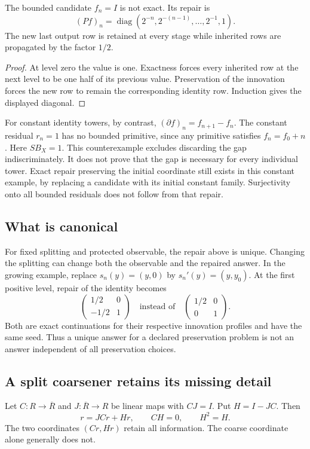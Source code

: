 \begin{example}\label{KS22}
The bounded candidate \(f_n=I\) is not exact. Its repair is
\[
 (Pf)_n=\operatorname{diag}(2^{-n},2^{-(n-1)},\ldots,2^{-1},1).
\]
The new last output row is retained at every stage while inherited rows are propagated by the factor \(1/2\).
\end{example}
\begin{proof}
At level zero the value is one. Exactness forces every inherited row at the next level to be one half of its previous value. Preservation of the innovation forces the new row to remain the corresponding identity row. Induction gives the displayed diagonal.
\end{proof}
For constant identity towers, by contrast, \((\partial f)_n=f_{n+1}-f_n\). The constant residual \(r_n=1\) has no bounded primitive, since any primitive satisfies \(f_n=f_0+n\). Here \(SB_X=1\). This counterexample excludes discarding the gap indiscriminately. It does not prove that the gap is necessary for every individual tower. Exact repair preserving the initial coordinate still exists in this constant example, by replacing a candidate with its initial constant family. Surjectivity onto all bounded residuals does not follow from that repair.

\subsection{What is canonical}
For fixed splitting and protected observable, the repair above is unique. Changing the splitting can change both the observable and the repaired answer. In the growing example, replace \(s_n(y)=(y,0)\) by \(s_n'(y)=(y,y_0)\). At the first positive level, repair of the identity becomes
\[
 \begin{pmatrix}1/2&0\\-1/2&1\end{pmatrix}
 \quad\text{instead of}\quad
 \begin{pmatrix}1/2&0\\0&1\end{pmatrix}.
\]
Both are exact continuations for their respective innovation profiles and have the same seed. Thus a unique answer for a declared preservation problem is not an answer independent of all preservation choices.

\label{sec:cascade}
\subsection{A split coarsener retains its missing detail}
Let \(C:R\to\overline R\) and \(J:\overline R\to R\) be linear maps with \(CJ=I\). Put \(H=I-JC\). Then
\[
 r=JCr+Hr,\qquad CH=0,\qquad H^2=H.
\]
The two coordinates \((Cr,Hr)\) retain all information. The coarse coordinate alone generally does not.

